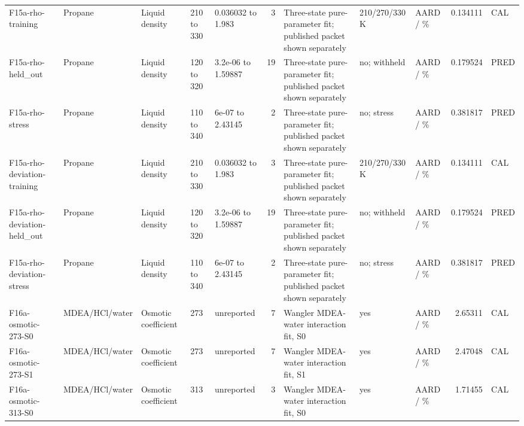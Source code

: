 \begin{landscape}
\begin{longtable}{L{1.9cm}L{2.5cm}L{2.1cm}L{1.6cm}L{1.6cm}rL{2.4cm}L{1.9cm}L{2.2cm}rL{1cm}}
F15a-\allowbreak{}rho-\allowbreak{}training & Propane & Liquid density & 210 to 330 & 0.036032 to 1.983 & 3 & Three-\allowbreak{}state pure-\allowbreak{}parameter fit; published packet shown separately & 210/\allowbreak{}270/\allowbreak{}330 K & AARD /\allowbreak{} \% & 0.134111 & CAL \\
F15a-\allowbreak{}rho-\allowbreak{}held\_\allowbreak{}out & Propane & Liquid density & 120 to 320 & 3.2e-\allowbreak{}06 to 1.59887 & 19 & Three-\allowbreak{}state pure-\allowbreak{}parameter fit; published packet shown separately & no; withheld & AARD /\allowbreak{} \% & 0.179524 & PRED \\
F15a-\allowbreak{}rho-\allowbreak{}stress & Propane & Liquid density & 110 to 340 & 6e-\allowbreak{}07 to 2.43145 & 2 & Three-\allowbreak{}state pure-\allowbreak{}parameter fit; published packet shown separately & no; stress & AARD /\allowbreak{} \% & 0.381817 & PRED \\
F15a-\allowbreak{}rho-\allowbreak{}deviation-\allowbreak{}training & Propane & Liquid density & 210 to 330 & 0.036032 to 1.983 & 3 & Three-\allowbreak{}state pure-\allowbreak{}parameter fit; published packet shown separately & 210/\allowbreak{}270/\allowbreak{}330 K & AARD /\allowbreak{} \% & 0.134111 & CAL \\
F15a-\allowbreak{}rho-\allowbreak{}deviation-\allowbreak{}held\_\allowbreak{}out & Propane & Liquid density & 120 to 320 & 3.2e-\allowbreak{}06 to 1.59887 & 19 & Three-\allowbreak{}state pure-\allowbreak{}parameter fit; published packet shown separately & no; withheld & AARD /\allowbreak{} \% & 0.179524 & PRED \\
F15a-\allowbreak{}rho-\allowbreak{}deviation-\allowbreak{}stress & Propane & Liquid density & 110 to 340 & 6e-\allowbreak{}07 to 2.43145 & 2 & Three-\allowbreak{}state pure-\allowbreak{}parameter fit; published packet shown separately & no; stress & AARD /\allowbreak{} \% & 0.381817 & PRED \\
F16a-\allowbreak{}osmotic-\allowbreak{}273-\allowbreak{}S0 & MDEA/\allowbreak{}HCl/\allowbreak{}water & Osmotic coefficient & 273 & unreported & 7 & Wangler MDEA-\allowbreak{}water interaction fit, S0 & yes & AARD /\allowbreak{} \% & 2.65311 & CAL \\
F16a-\allowbreak{}osmotic-\allowbreak{}273-\allowbreak{}S1 & MDEA/\allowbreak{}HCl/\allowbreak{}water & Osmotic coefficient & 273 & unreported & 7 & Wangler MDEA-\allowbreak{}water interaction fit, S1 & yes & AARD /\allowbreak{} \% & 2.47048 & CAL \\
F16a-\allowbreak{}osmotic-\allowbreak{}313-\allowbreak{}S0 & MDEA/\allowbreak{}HCl/\allowbreak{}water & Osmotic coefficient & 313 & unreported & 3 & Wangler MDEA-\allowbreak{}water interaction fit, S0 & yes & AARD /\allowbreak{} \% & 1.71455 & CAL \\

\end{longtable}
\end{landscape}
